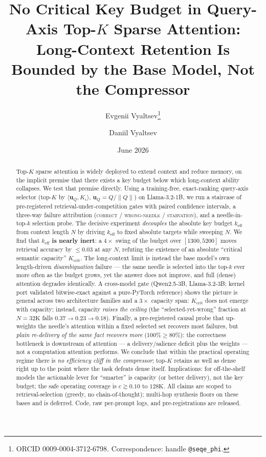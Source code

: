 \documentclass[11pt]{article}
\title{\bfseries No Critical Key Budget in Query-Axis Top-$K$ Sparse Attention:\\
Long-Context Retention Is Bounded by the Base Model, Not the Compressor}
\author[1]{Evgenii Vyaltsev\thanks{ORCID 0009-0004-3712-6798. Correspondence: handle \texttt{@seqe\_phi}.}}
\author[1]{Daniil Vyaltsev}
\affil[1]{Independent Researcher}
\date{June 2026}
\newcommand{\keff}{k_{\mathrm{eff}}}
\newcommand{\Kcrit}{K_{\mathrm{crit}}}
\newcommand{\uQ}{\mathbf{u}_Q}
\begin{document}
\maketitle

\begin{abstract}
\noindent
Top-$K$ sparse attention is widely deployed to extend context and reduce memory,
on the implicit premise that there exists a key budget below which long-context
ability collapses. We test that premise directly. Using a training-free,
exact-ranking query-axis selector (top-$K$ by $\langle\uQ,K_i\rangle$,
$\uQ=Q/\lVert Q\rVert$) on Llama-3.2-1B, we run a staircase of pre-registered
retrieval-under-competition gates with paired confidence intervals, a three-way
failure attribution (\textsc{correct} / \textsc{wrong-needle} / \textsc{starvation}),
and a needle-in-top-$k$ selection probe. The decisive experiment \emph{decouples}
the absolute key budget $\keff$ from context length $N$ by driving $\keff$ to fixed
absolute targets while sweeping $N$. We find that \textbf{$\keff$ is nearly inert}:
a $4\times$ swing of the budget over $[1300,5200]$ moves retrieval accuracy by
$\le 0.03$ at any $N$, refuting the existence of an absolute ``critical semantic
capacity'' $\Kcrit$. The long-context limit is instead the base model's own
length-driven \emph{disambiguation} failure --- the same needle is selected into
the top-$k$ ever more often as the budget grows, yet the answer does not improve,
and full (dense) attention degrades identically. A cross-model gate
(Qwen2.5-3B, Llama-3.2-3B; kernel port validated bitwise-exact against a
pure-PyTorch reference) shows the picture is general across two architecture
families and a $3\times$ capacity span: $\Kcrit$ does not emerge with capacity;
instead, capacity \emph{raises the ceiling} (the ``selected-yet-wrong'' fraction at
$N{=}32\mathrm{K}$ falls $0.37\!\to\!0.23\!\to\!0.18$). Finally, a pre-registered
causal probe that up-weights the needle's attention within a fixed selected set
recovers most failures, but \emph{plain re-delivery of the same fact recovers more}
($100\%\ge 80\%$): the correctness bottleneck is downstream of attention --- a
delivery/salience deficit plus the weights --- not a computation attention performs.
We conclude that within the practical operating regime there is \emph{no efficiency
cliff in the compressor}; top-$K$ retains as well as dense right up to the point
where the task defeats dense itself. Implications: for off-the-shelf models the
actionable lever for ``smarter'' is capacity (or better delivery), not the key
budget; the safe operating coverage is $c\gtrsim 0.10$ to $128\mathrm{K}$.
All claims are scoped to retrieval-selection (greedy, no chain-of-thought);
multi-hop synthesis floors on these bases and is deferred.
Code, raw per-prompt logs, and pre-registrations are released.
\end{abstract}
\end{document}
